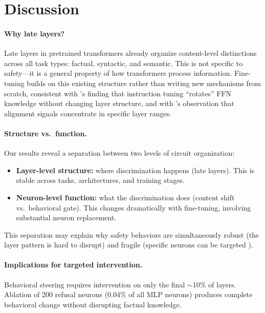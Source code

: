 \documentclass{article}
\begin{document}
\section{Discussion}
\label{sec:discussion}

\paragraph{Why late layers?}
Late layers in pretrained transformers already organize content-level distinctions across all task types: factual, syntactic, and semantic.
This is not specific to safety---it is a general property of how transformers process information.
Fine-tuning builds on this existing structure rather than writing new mechanisms from scratch, consistent with \citet{wu2024instruction}'s finding that instruction tuning ``rotates'' FFN knowledge without changing layer structure, and with \citet{chaudhury2025alignment}'s observation that alignment signals concentrate in specific layer ranges.

\paragraph{Structure vs.\ function.}
Our results reveal a separation between two levels of circuit organization:
\begin{itemize}
\item \textbf{Layer-level structure:} where discrimination happens (late layers). This is stable across tasks, architectures, and training stages.
\item \textbf{Neuron-level function:} what the discrimination does (content shift vs.\ behavioral gate). This changes dramatically with fine-tuning, involving substantial neuron replacement.
\end{itemize}
This separation may explain why safety behaviors are simultaneously robust (the layer pattern is hard to disrupt) and fragile (specific neurons can be targeted \citep{wang2026safeneuron}).

\paragraph{Implications for targeted intervention.}
Behavioral steering requires intervention on only the final ${\sim}$10\% of layers.
Ablation of 200 refusal neurons (0.04\% of all MLP neurons) produces complete behavioral change without disrupting factual knowledge.
\end{document}
